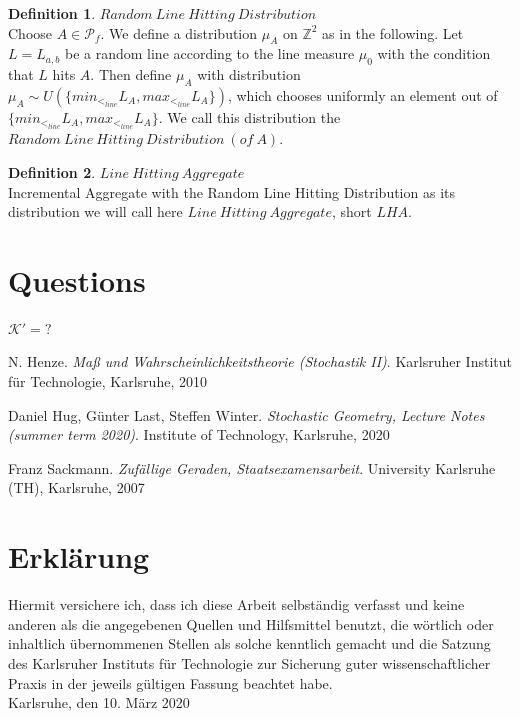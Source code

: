 \documentclass[12pt,a4paper]{scrartcl}
\numberwithin{equation}{subsection}
\newcommand{\1}{\mathbbm{1}}
\numberwithin{equation}{section}
\theoremstyle{definition}
\newtheorem{definition}{Definition}[subsection]
\begin{document}
\begin{definition} $\mathit{Random\ Line\ Hitting\ Distribution}$\\
	\indent Choose $A\in \mathcal{P}_f$. We define a distribution $\mu_A$ on $\mathbb{Z}^2$ as in the following. 
	Let $L=L_{a,b}$ be a random line according to the line measure $\mu_0$ with the condition that $L$ hits $A$. Then define $\mu_A$ with distribution $\mu_A \sim U(\{min_{<_{line}}L_A, max_{<_{line}}L_A\})$, which chooses uniformly an element out of $\{min_{<_{line}}L_A, max_{<_{line}}L_A\}$. We call this distribution the $\mathit{Random\ Line\ Hitting\ Distribution\ (of\ A)}$.
\end{definition}

\begin{definition} $\mathit{Line\ Hitting\ Aggregate}$\\
	\indent Incremental Aggregate with the Random Line Hitting Distribution as its distribution we will call here $\mathit{Line\ Hitting\ Aggregate}$, short $\mathit{LHA}$. 
\end{definition}

\newpage
\section{Questions}
$\mathcal{K}'=?$

\newpage

\begin{thebibliography}{biblio}
\thispagestyle{empty}

N. Henze.
\emph{Maß und Wahrscheinlichkeitstheorie (Stochastik II)}.
Karlsruher Institut für Technologie, Karlsruhe, 2010

Daniel Hug, Günter Last, Steffen Winter.
\emph{Stochastic Geometry, 	Lecture Notes (summer term 2020)}.
Institute of Technology, Karlsruhe, 2020

Franz Sackmann. 
\emph{Zufällige Geraden, Staatsexamensarbeit}.
University Karlsruhe (TH), Karlsruhe, 2007



\end{thebibliography}

\newpage
  
\thispagestyle{empty}

\vspace*{8cm}


\section*{Erklärung}

Hiermit versichere ich, dass ich diese Arbeit selbständig verfasst und keine anderen als die angegebenen Quellen und Hilfsmittel benutzt, die wörtlich oder inhaltlich übernommenen Stellen als solche kenntlich gemacht und die Satzung des Karlsruher Instituts für Technologie zur Sicherung guter wissenschaftlicher Praxis in der jeweils gültigen Fassung beachtet habe. \\[2ex] 

\noindent
Karlsruhe, den 10. März 2020\\[5ex] 
\end{document}
